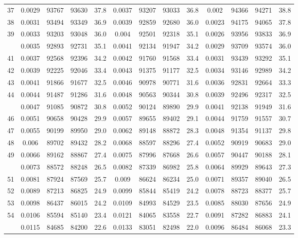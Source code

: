 \documentclass[
  14pt,
]{article}
\begin{document}
\begin{longtable}[t]{lcccccccccccc}
37 & 0.0029 & 93767 & 93630 & 37.8 & 0.0037 & 93207 & 93033 & 36.8 & 0.002 & 94366 & 94271 & 38.8\\
38 & 0.0031 & 93494 & 93349 & 36.9 & 0.0039 & 92859 & 92680 & 36.0 & 0.0023 & 94175 & 94065 & 37.8\\
39 & 0.0033 & 93203 & 93048 & 36.0 & 0.004 & 92501 & 92318 & 35.1 & 0.0026 & 93956 & 93833 & 36.9\\
\addlinespace
40 & 0.0035 & 92893 & 92731 & 35.1 & 0.0041 & 92134 & 91947 & 34.2 & 0.0029 & 93709 & 93574 & 36.0\\
41 & 0.0037 & 92568 & 92396 & 34.2 & 0.0042 & 91760 & 91568 & 33.4 & 0.0031 & 93439 & 93292 & 35.1\\
42 & 0.0039 & 92225 & 92046 & 33.4 & 0.0043 & 91375 & 91177 & 32.5 & 0.0034 & 93146 & 92989 & 34.2\\
43 & 0.0041 & 91866 & 91677 & 32.5 & 0.0046 & 90978 & 90771 & 31.6 & 0.0036 & 92831 & 92664 & 33.3\\
44 & 0.0044 & 91487 & 91286 & 31.6 & 0.0048 & 90563 & 90344 & 30.8 & 0.0039 & 92496 & 92317 & 32.5\\
\addlinespace
45 & 0.0047 & 91085 & 90872 & 30.8 & 0.0052 & 90124 & 89890 & 29.9 & 0.0041 & 92138 & 91949 & 31.6\\
46 & 0.0051 & 90658 & 90428 & 29.9 & 0.0057 & 89655 & 89402 & 29.1 & 0.0044 & 91759 & 91557 & 30.7\\
47 & 0.0055 & 90199 & 89950 & 29.0 & 0.0062 & 89148 & 88872 & 28.3 & 0.0048 & 91354 & 91137 & 29.8\\
48 & 0.006 & 89702 & 89432 & 28.2 & 0.0068 & 88597 & 88296 & 27.4 & 0.0052 & 90919 & 90683 & 29.0\\
49 & 0.0066 & 89162 & 88867 & 27.4 & 0.0075 & 87996 & 87668 & 26.6 & 0.0057 & 90447 & 90188 & 28.1\\
\addlinespace
50 & 0.0073 & 88572 & 88248 & 26.5 & 0.0082 & 87339 & 86982 & 25.8 & 0.0064 & 89929 & 89643 & 27.3\\
51 & 0.0081 & 87924 & 87569 & 25.7 & 0.009 & 86624 & 86234 & 25.0 & 0.0071 & 89357 & 89040 & 26.5\\
52 & 0.0089 & 87213 & 86825 & 24.9 & 0.0099 & 85844 & 85419 & 24.2 & 0.0078 & 88723 & 88377 & 25.7\\
53 & 0.0098 & 86437 & 86015 & 24.2 & 0.0109 & 84993 & 84529 & 23.5 & 0.0085 & 88030 & 87656 & 24.9\\
54 & 0.0106 & 85594 & 85140 & 23.4 & 0.0121 & 84065 & 83558 & 22.7 & 0.0091 & 87282 & 86883 & 24.1\\
\addlinespace
55 & 0.0115 & 84685 & 84200 & 22.6 & 0.0133 & 83051 & 82498 & 22.0 & 0.0096 & 86484 & 86068 & 23.3\\

\end{longtable}
\end{document}
